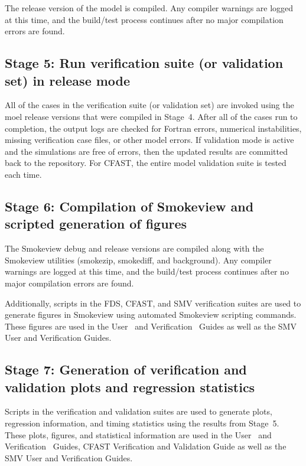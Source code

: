 \documentclass[11pt]{book}
\begin{document}
The release version of the model is compiled. Any compiler warnings are logged at this time, and the build/test process continues after no major compilation errors are found.

\subsection*{Stage 5: Run verification suite (or validation set) in release mode}

All of the cases in the verification suite (or validation set) are invoked using the moel release versions that were compiled in Stage~4. After all of the cases run to completion, the output logs are checked for Fortran errors, numerical instabilities, missing verification case files, or other model errors. If validation mode is active and the simulations are free of errors, then the updated results are committed back to the repository. For CFAST, the entire model validation suite is tested each time.

\subsection*{Stage 6: Compilation of Smokeview and scripted generation of figures}

The Smokeview debug and release versions are compiled along with the Smokeview utilities (smokezip, smokediff, and background). Any compiler warnings are logged at this time, and the build/test process continues after no major compilation errors are found.

Additionally, scripts in the FDS, CFAST, and SMV verification suites are used to generate figures in Smokeview using automated Smokeview scripting commands. These figures are used in the User~\cite{FDS_Users_Guide} \cite{CFAST_Users_Guide_7} and Verification~\cite{FDS_Verification_Guide} Guides as well as the SMV User and Verification Guides.

\subsection*{Stage 7: Generation of verification and validation plots and regression statistics}

Scripts in the verification and validation suites are used to generate plots, regression information, and timing statistics using the results from Stage~5. These plots, figures, and statistical information are used in the  User~\cite{FDS_Users_Guide} \cite{CFAST_Users_Guide_7} and Verification~\cite{FDS_Verification_Guide} Guides, CFAST Verification and Validation Guide \cite{CFAST_Valid_Guide_7} as well as the SMV User and Verification Guides.
\end{document}
